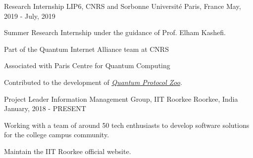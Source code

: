 

\begin{cventries}

  \cventry
    {Research Internship} %
    {LIP6, CNRS and Sorbonne Universit\'e} %
    {Paris, France} %
    {May, 2019 - July, 2019} %
    {
      \begin{cvitems} %
        \item {Summer Research Internship under the guidance of Prof. Elham Kashefi.}
        \item {Part of the Quantum Internet Alliance team at CNRS}
        \item {Associated with Paris Centre for Quantum Computing}
        \item {Contributed to the development of \emph{ \href{https://wiki.veriqloud.fr}{Quantum Protocol Zoo}}.}
      \end{cvitems}
    }

  \cventry
    {Project Leader} %
    {Information Management Group, IIT Roorkee} %
    {Roorkee, India} %
    {January, 2018 - PRESENT} %
    {
      \begin{cvitems} %
        \item {Working with a team of around 50 tech enthusiasts to develop software solutions for the college campus community.}
        \item {Maintain the IIT Roorkee official website.}
      \end{cvitems}
    }

\end{cventries}